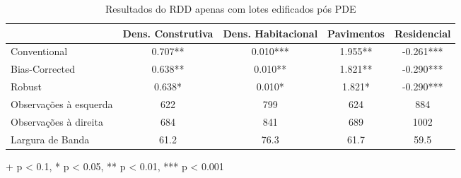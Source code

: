 \begin{table}[h]
\caption{Resultados do RDD apenas com lotes edificados pós PDE} 
\fontsize{10pt}{12pt}\selectfont
\centering
\begin{tabular*}{.9\linewidth}{@{\extracolsep{\fill}}lcccc}
\toprule
  & Dens. Construtiva & Dens. Habitacional & Pavimentos & Residencial \\ 
\midrule\addlinespace[2.5pt]
Conventional & 0.707** & 0.010*** & 1.955** & -0.261*** \\ 
Bias-Corrected & 0.638** & 0.010** & 1.821** & -0.290*** \\ 
{Robust} & {0.638*} & {0.010*} & {1.821*} & {-0.290***} \\ 
\midrule
Observações à esquerda & 622 & 799 & 624 & 884 \\ 
Observações à direita & 684 & 841 & 689 & 1002 \\ 
Largura de Banda & 61.2 & 76.3 & 61.7 & 59.5 \\ 
\bottomrule
\end{tabular*}
\label{tab:rdd-IPTU}

\begin{minipage}{.9\linewidth}
+ p < 0.1, * p < 0.05, ** p < 0.01, *** p < 0.001\\
\end{minipage}
\end{table}


